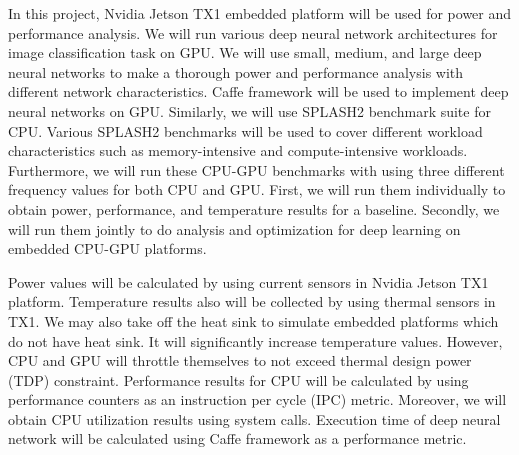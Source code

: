 In this project, Nvidia Jetson TX1 embedded platform will be used for power and performance analysis. We will run various deep neural network architectures for image classification task on GPU. We will use small, medium, and large deep neural networks to make a thorough power and performance analysis with different network characteristics. Caffe framework \cite{caffe} will be used to implement deep neural networks on GPU. Similarly, we will use SPLASH2 benchmark suite \cite{woo1995splash} for CPU. Various SPLASH2 benchmarks will be used to cover different workload characteristics such as memory-intensive and compute-intensive workloads. Furthermore, we will run these CPU-GPU benchmarks with using three different frequency values for both CPU and GPU. First, we will run them individually to obtain power, performance, and temperature results for a baseline. Secondly, we will run them jointly to do analysis and optimization for deep learning on embedded CPU-GPU platforms.

Power values will be calculated by using current sensors in Nvidia Jetson TX1 platform. Temperature results also will be collected by using thermal sensors in TX1. We may also take off the heat sink to simulate embedded platforms which do not have heat sink. It will significantly increase temperature values. However, CPU and GPU will throttle themselves to not exceed thermal design power (TDP) constraint. Performance results for CPU will be calculated by using performance counters as an instruction per cycle (IPC) metric. Moreover, we will obtain CPU utilization results using system calls. Execution time of deep neural network will be calculated using Caffe framework as a performance metric. 
